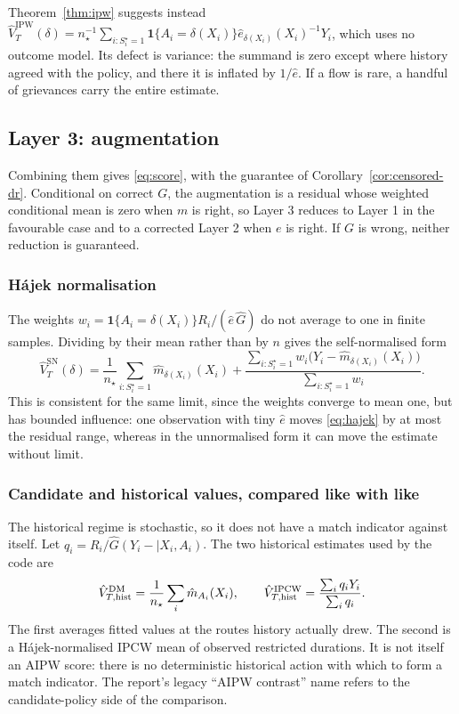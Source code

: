 \documentclass[11pt,a4paper]{article}
\theoremstyle{plain}
\theoremstyle{definition}
\theoremstyle{remark}
\newcommand{\one}[1]{\mathbf 1\{#1\}}
\newcommand{\Sstar}{S^{\star}}
\begin{document}
Theorem~\ref{thm:ipw} suggests instead
$\hat V^{\text{IPW}}_T(\delta)=n_\star^{-1}\sum_{i:\Sstar_i=1}\one{A_i=\delta(X_i)}\hat e_{\delta(X_i)}(X_i)^{-1}Y_i$,
which uses no outcome model. Its defect is variance: the summand is zero except where history
agreed with the policy, and there it is inflated by $1/\hat e$. If a flow is rare, a handful of
grievances carry the entire estimate.

\subsection{Layer 3: augmentation}

Combining them gives \eqref{eq:score}, with the guarantee of
Corollary~\ref{cor:censored-dr}. Conditional on correct $G$, the augmentation is a residual
whose weighted conditional mean is zero when $m$ is right, so Layer 3 reduces to Layer 1 in
the favourable case and to a corrected Layer 2 when $e$ is right. If $G$ is wrong, neither
reduction is guaranteed.

\subsubsection{Hájek normalisation}

The weights $w_i=\one{A_i=\delta(X_i)}R_i/(\hat e\,\hat G)$ do not average to one in finite
samples. Dividing by their mean rather than by $n$ gives the self-normalised form
\begin{equation}
\hat V^{\text{SN}}_T(\delta)
=\frac1{n_\star}\sum_{i:\Sstar_i=1}\hat m_{\delta(X_i)}(X_i)
+\frac{\sum_{i:\Sstar_i=1}w_i\bigl(Y_i-\hat m_{\delta(X_i)}(X_i)\bigr)}{\sum_{i:\Sstar_i=1}w_i}.
\label{eq:hajek}
\end{equation}
This is consistent for the same limit, since the weights converge to mean one, but has bounded
influence: one observation with tiny $\hat e$ moves \eqref{eq:hajek} by at most the residual
range, whereas in the unnormalised form it can move the estimate without limit.

\subsubsection{Candidate and historical values, compared like with like}

The historical regime is stochastic, so it does not have a match indicator against itself. Let
$q_i=R_i/\hat G(Y_i-\mid X_i,A_i)$. The two historical estimates used by the code are
\begin{equation}
\hat V^{\rm DM}_{T,\rm hist}=\frac1{n_\star}\sum_i\hat m_{A_i}(X_i),
\qquad
\hat V^{\rm IPCW}_{T,\rm hist}=\frac{\sum_iq_iY_i}{\sum_iq_i}.
\label{eq:historical-estimators}
\end{equation}
The first averages fitted values at the routes history actually drew. The second is a
H\'ajek-normalised IPCW mean of observed restricted durations. It is not itself an AIPW score:
there is no deterministic historical action with which to form a match indicator. The report's
legacy ``AIPW contrast'' name refers to the candidate-policy side of the comparison.
\end{document}
